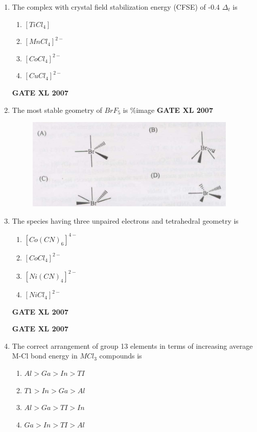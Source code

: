 \documentclass[journal,12pt,onecolumn]{IEEEtran}
\begin{document}
\begin{enumerate}[resume]
    \item The complex with crystal field stabilization energy (CFSE) of -0.4 $\Delta_{t}$ is 
    \begin{multicols}{4}
        \begin{enumerate} 
            \item $[TiCl_{4}]$
            \item $[MnCl_{4}]^{2-}$
            \item $[CoCl_{4}]^{2-}$
            \item $[CuCl_{4}]^{2-}$
        \end{enumerate}
    \end{multicols}
	    \hfill \textbf{GATE XL 2007}

    \item The most stable geometry of $BrF_{5}$ is \%image \hfill \textbf{GATE XL 2007}
    \begin{figure}[h!]
	\centering
	\includegraphics[width=10cm]{15}
	\caption*{}
	\label{fig:Q15}
	\end{figure} 
\item The species having three unpaired electrons and tetrahedral geometry is 
    \begin{multicols}{4}
        \begin{enumerate} 
            \item $[Co(CN)_{6}]^{4-}$
            \item $[CoCl_{4}]^{2-}$
            \item $[Ni(CN)_{4}]^{2-}$
            \item $[NiCl_{4}]^{2-}$
        \end{enumerate}\hfill{\textbf{GATE XL 2007}}
    \end{multicols}
	    \hfill \textbf{GATE XL 2007}

    \item The correct arrangement of group 13 elements in terms of increasing average M-Cl bond energy in $MCl_{3}$ compounds is 
        \begin{enumerate} 
            \item $Al>Ga>In>TI$
            \item $T1>In>Ga>Al$
            \item $Al>Ga>TI>In$
            \item $Ga>In>TI>Al$
        \end{enumerate}


\end{enumerate}
\end{document}
